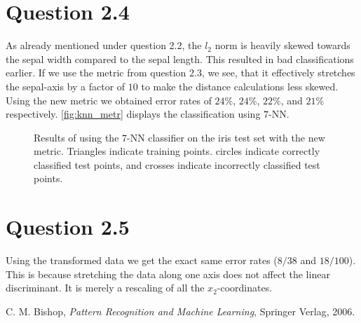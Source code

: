 \documentclass[11pt,a4paper]{article}
\begin{document}
\section{Question 2.4}
As already mentioned under question 2.2, the $l_2$ norm is heavily skewed
towards the sepal width compared to the sepal length. This resulted in bad
classifications earlier. If we use the metric from question 2.3, we see, that
it effectively stretches the sepal-axis by a factor of $10$ to make the
distance calculations less skewed. Using the new metric we obtained error rates
of $24\%$, $24\%$, $22\%$, and $21\%$ respectively. \autoref{fig:knn_metr}
displays the classification using $7$-NN.

\begin{figure}[htbp]
    \centering
    \caption{Results of using the $7$-NN classifier on the iris test set with
    the new metric. Triangles indicate training points. circles indicate
    correctly classified test points, and crosses indicate incorrectly classified
    test points.}
    \label{fig:knn_metr}
\end{figure}

\section{Question 2.5}
Using the transformed data we get the exact same error rates ($8/38$ and
$18/100$). This is because stretching the data along one axis does not affect
the linear discriminant. It is merely a rescaling of all the $x_2$-coordinates.



\begin{thebibliography}{9}
        C. M. Bishop,
        \emph{Pattern Recognition and Machine Learning},
        Springer Verlag,
        2006.
\end{thebibliography}
\end{document}
